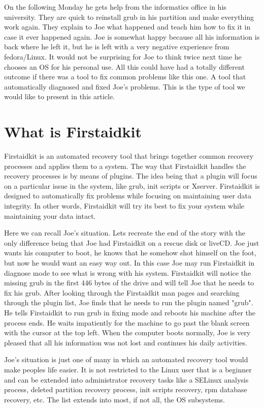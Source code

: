 \documentclass[a4paper,13pt]{article}
\begin{document}
On the following Monday he gets help from the informatics office in his university.
They are quick to reinstall grub in his partition and make everything work again.
They explain to Joe what happened and teach him how to fix it in case it ever happened
again.  Joe is somewhat happy because all his information is back where he left it,
but he is left with a very negative experience from fedora/Linux.  It would not be
surprising for Joe to think twice next time he chooses an OS for his personal use.
All this could have had a totally different outcome if there was a tool to fix common
problems like this one.  A tool that automatically diagnosed and fixed Joe's problems.
This is the type of tool we would like to present in this article.

\section{What is Firstaidkit}
Firstaidkit is an automated recovery tool that brings together common recovery processes
and applies them to a system.  The way that Firstaidkit handles the recovery processes
is by means of plugins.  The idea being that a plugin will focus on a particular issue
in the system, like grub, init scripts or Xserver.  Firstaidkit is designed to automatically
fix problems while focusing on maintaining user data integrity.  In other words, Firstaidkit
will try its best to fix your system while maintaining your data intact.

Here we can recall Joe's situation.  Lets recreate the end of the story with the only
difference being that Joe had Firstaidkit on a rescue disk or liveCD.  Joe just
wants his computer to boot, he knows that he somehow shot himself on the foot, but
now he would want an easy way out.  In this case Joe may run Firstaidkit in diagnose
mode to see what is wrong with his system.  Firstaidkit will notice the missing grub
in the first 446 bytes of the drive and will tell Joe that he needs to fix his grub.
After looking through the Firstaidkit man pages and searching through the plugin list,
Joe finds that he needs to run the plugin named "grub".  He tells Firstaidkit to run
grub in fixing mode and reboots his machine after the process ends.  He waits
impatiently for the machine to go past the blank screen with the cursor at the top left.
When the computer boots normally, Joe is very pleased that all his information was not
lost and continues his daily activities.

Joe's situation is just one of many in which an automated recovery tool would make
peoples life easier.  It is not restricted to the Linux user that is a beginner
and can be extended into administrator recovery tasks like a SELinux analysis process,
deleted partition recovery process, init scripts recovery, rpm database recovery, etc.
The list extends into most, if not all, the OS subsystems.
\end{document}

